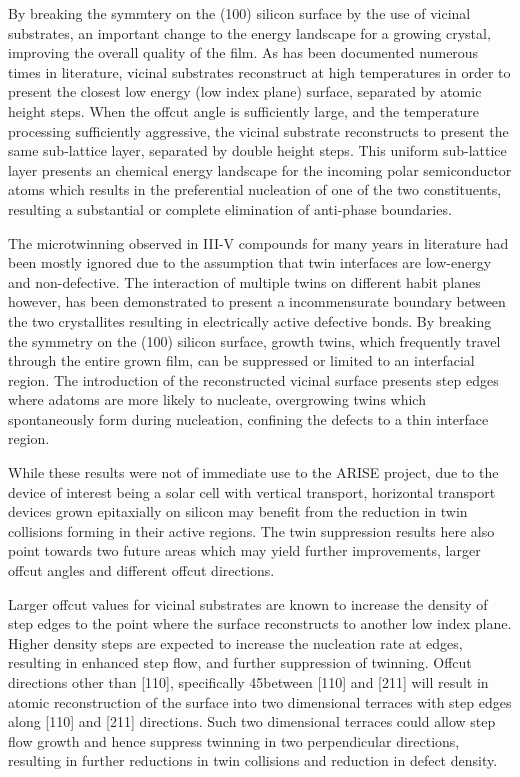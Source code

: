 By breaking the symmtery on the (100) silicon surface by the use of vicinal substrates, an important change to the energy landscape for a growing crystal, improving the overall quality of the film. As has been documented numerous times in literature, vicinal substrates reconstruct at high temperatures in order to present the closest low energy (low index plane) surface, separated by atomic height steps. When the offcut angle is sufficiently large, and the temperature processing sufficiently aggressive, the vicinal substrate reconstructs to present the same sub-lattice layer, separated by double height steps. This uniform sub-lattice layer presents an chemical energy landscape for the incoming polar semiconductor atoms which results in the preferential nucleation of one of the two constituents, resulting a substantial or complete elimination of anti-phase boundaries.

The microtwinning observed in III-V compounds for many years in literature had been mostly ignored due to the assumption that twin interfaces are low-energy and non-defective. The interaction of multiple twins on different habit planes however, has been demonstrated to present a incommensurate boundary between the two crystallites resulting in electrically active defective bonds. By breaking the symmetry on the (100) silicon surface, growth twins, which frequently travel through the entire grown film, can be suppressed or limited to an interfacial region. The introduction of the reconstructed vicinal surface presents step edges where adatoms are more likely to nucleate, overgrowing twins which spontaneously form during nucleation, confining the defects to a thin interface region.

While these results were not of immediate use to the ARISE project, due to the device of interest being a solar cell with vertical transport, horizontal transport devices grown epitaxially on silicon may benefit from the reduction in twin collisions forming in their active regions. The twin suppression results here also point towards two future areas which may yield further improvements, larger offcut angles and different offcut directions.

Larger offcut values for vicinal substrates are known to increase the density of step edges to the point where the surface reconstructs to another low index plane. Higher density steps are expected to increase the nucleation rate at edges, resulting in enhanced step flow, and further suppression of twinning. Offcut directions other than [110], specifically 45\degrees between [110] and [211] will result in atomic reconstruction of the surface into two dimensional terraces with step edges along [110] and [211] directions. Such two dimensional terraces could allow step flow growth and hence suppress twinning in two perpendicular directions, resulting in further reductions in twin collisions and reduction in defect density.